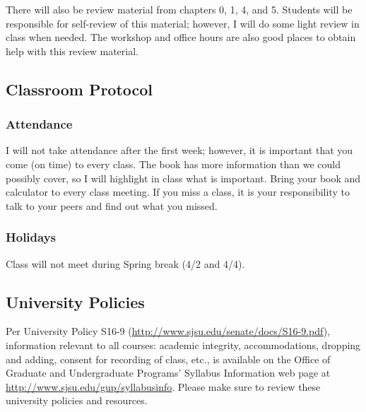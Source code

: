 \documentclass[letterpaper,12pt,fleqn]{article}
\begin{document}
There will also be review material from chapters 0, 1, 4, and 5.  Students will be responsible for self-review of this
material; however, I will do some light review in class when needed.  The workshop and office hours are also good places to
obtain help with this review material.

\subsection*{Classroom Protocol}
  
\subsubsection*{Attendance}

I will not take attendance after the first week; however, it is important that you come (on time) to every class. The book
has more information than we could possibly cover, so I will highlight in class what is important. Bring your book and
calculator to every class meeting. If you miss a class, it is your responsibility to talk to your peers and find out what you
missed.

\subsubsection*{Holidays}

Class will not meet during Spring break (4/2 and 4/4).

\subsection*{University Policies}

Per University Policy S16-9 (\url{http://www.sjsu.edu/senate/docs/S16-9.pdf}), information relevant to all courses:
academic integrity, accommodations, dropping and adding, consent for recording of class, etc., is available on the Office of
Graduate and Undergraduate Programs’ Syllabus Information web page at \url{http://www.sjsu.edu/gup/syllabusinfo}.
Please make sure to review these university policies and resources.
\end{document}
